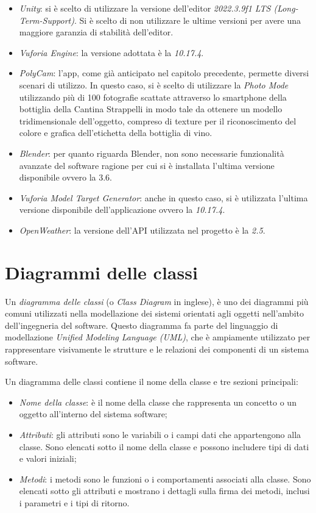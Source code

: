 \begin{itemize}
    \item \textit{Unity}: si è scelto di utilizzare la versione dell'editor \textit{2022.3.9f1 LTS (Long-Term-Support)}. Si è scelto di non utilizzare le ultime versioni per avere una maggiore garanzia di stabilità dell'editor.
    \item \textit{Vuforia Engine}: la versione adottata è la \textit{10.17.4}. 
    \item \textit{PolyCam}: l'app, come già anticipato nel capitolo precedente, permette diversi scenari di utilizzo. In questo caso, si è scelto di utilizzare la \textit{Photo Mode} utilizzando più di 100 fotografie scattate attraverso lo smartphone della bottiglia della Cantina Strappelli in modo tale da ottenere un modello tridimensionale dell'oggetto, compreso di texture per il riconoscimento del colore e grafica dell'etichetta della bottiglia di vino.
    \item \textit{Blender}: per quanto riguarda Blender, non sono necessarie funzionalità avanzate del software ragione per cui si è installata l'ultima versione disponibile ovvero la 3.6.
    \item \textit{Vuforia Model Target Generator}: anche in questo caso, si è utilizzata l'ultima versione disponibile dell'applicazione ovvero la \textit{10.17.4}.
    \item \textit{OpenWeather}: la versione dell'API utilizzata nel progetto è la \textit{2.5}.
\end{itemize}

\section{Diagrammi delle classi}

Un \textit{diagramma delle classi} (o \textit{Class Diagram} in inglese), è uno dei diagrammi più comuni utilizzati nella modellazione dei sistemi orientati agli oggetti nell'ambito dell'ingegneria del software. Questo diagramma fa parte del linguaggio di modellazione \textit{Unified Modeling Language (UML)}, che è ampiamente utilizzato per rappresentare visivamente le strutture e le relazioni dei componenti di un sistema software.

Un diagramma delle classi contiene il nome della classe e tre sezioni principali:

\begin{itemize}
    \item \textit{Nome della classe}: è il nome della classe che rappresenta un concetto o un oggetto all'interno del sistema software;
    \item \textit{Attributi}: gli attributi sono le variabili o i campi dati che appartengono alla classe. Sono elencati sotto il nome della classe e possono includere tipi di dati e valori iniziali;
    \item \textit{Metodi}: i metodi sono le funzioni o i comportamenti associati alla classe. Sono elencati sotto gli attributi e mostrano i dettagli sulla firma dei metodi, inclusi i parametri e i tipi di ritorno.
\end{itemize}

